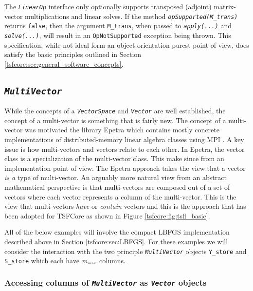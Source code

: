\documentclass[10pt,fleqn]{article}
\begin{document}
The \texttt{\textit{LinearOp}} interface only optionally supports
transposed (adjoint) matrix-vector multiplications and linear solves.
If the method \texttt{\textit{opSupported(M\_trans)}} returns
\texttt{false}, then the argument \texttt{M\_trans}, when
passed to \texttt{\textit{apply(...)}} and
\texttt{\textit{solve(...)}}, will result in an
\texttt{OpNotSupported} exception being thrown.
This specification, while not ideal form an object-orientation purest
point of view, does satisfy the basic principles outlined in Section
\ref{tsfcore:sec:general_software_concepts}.

%
\subsection{\texttt{\textit{MultiVector}}}
\label{tsfcore:sec:multi_vec}
%

While the concepts of a \texttt{\textit{VectorSpace}} and
\texttt{\textit{Vector}} are well established, the
concept of a multi-vector is something that is fairly new.  The
concept of a multi-vector was motivated the library Epetra
\cite{ref:Epetra} which contains mostly concrete implementations of
distributed-memory linear algebra classes using MPI \cite{ref:mpi}.  A
key issue is how multi-vectors and vectors relate to each other.  In
Epetra, the vector class is a specialization of the multi-vector
class.  This make since from an implementation point of view.  The
Epetra approach takes the view that a vector {\em is a} type of
multi-vector.  An arguably more natural view from an abstract
mathematical perspective is that multi-vectors are composed out of a
set of vectors where each vector represents a column of the
multi-vector.  This is the view that multi-vectors {\em have} or {\em
contain} vectors and this is the approach that has been adopted for
TSFCore as shown in Figure \ref{tsfcore:fig:tsfl_basic}.

All of the below examples will involve the compact LBFGS
implementation described above in Section \ref{tsfcore:sec:LBFGS}.  For
these examples we will consider the interaction with the two principle
\texttt{\textit{MultiVector}} objects \texttt{Y\_store} and
\texttt{S\_store} which each have $m_{\tiny\mbox{max}}$ columns.

%
\subsubsection{Accessing columns of \texttt{\textit{MultiVector}} as \texttt{\textit{Vector}} objects}
%
\end{document}
